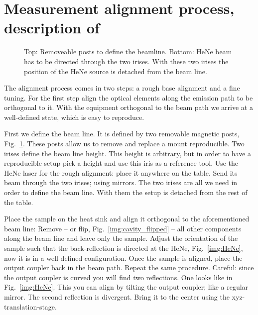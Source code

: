 \section{Measurement alignment process, description of}
\label{sec:alignment}

\begin{figure}
\centering
{}
\caption{Top: Removeable posts to define the beamline.
Bottom: HeNe beam has to be directed through the two irises.
With these two irises the position of the HeNe source is detached from the beam line.}
\label{img:beamline}
\end{figure}

The alignment process comes in two steps:
a rough base alignment
and a fine tuning.
For the first step
align the optical elements
along the emission path
to be orthogonal to it.
With the equipment
orthogonal to the beam path
we arrive
at a well-defined state,
which is easy to reproduce.

First we define the beam line.
It is defined by
two removable magnetic posts,
Fig.~\ref{img:beamline}.
These posts allow us to remove and replace a mount reproducible.
Two irises
define the beam line height.
This height
is arbitrary,
but in order to have
a reproducible setup
pick a height
and use this iris
as a reference tool.
Use the HeNe laser
for the rough alignment:
place it anywhere
on the table.
Send its beam
through the two irises;
using mirrors.
The two irises
are all we need
in order to define
the beam line.
With them
the setup is detached from the rest
of the table.

Place the sample
on the heat sink
and align it
orthogonal to the aforementioned beam line:
Remove -- or flip, Fig.~\ref{img:cavity_flipped} --
all other components along the beam line
and leave only the sample.
Adjust the orientation of the sample such that
the back-reflection is directed at the HeNe, Fig.~\ref{img:HeNe},
now it is in a well-defined configuration.
Once the sample is aligned,
place the output coupler
back in the beam path.
Repeat the same procedure.
Careful:
since the output coupler is curved
you will find two reflections.
One looks like in Fig.~\ref{img:HeNe}.
This you can align by tilting
the output coupler;
like a regular mirror.
The second reflection
is divergent.
Bring it to the center
using the xyz-translation-stage.

